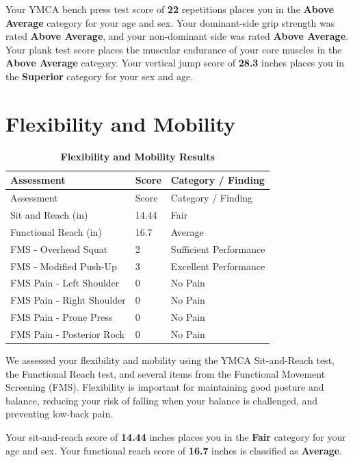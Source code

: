 \documentclass[
]{article}
\begin{document}
Your YMCA bench press test score of \textbf{22} repetitions places you
in the \textbf{Above Average} category for your age and sex. Your
dominant-side grip strength was rated \textbf{Above Average}, and your
non-dominant side was rated \textbf{Above Average}. Your plank test
score places the muscular endurance of your core muscles in the
\textbf{Above Average} category. Your vertical jump score of
\textbf{28.3} inches places you in the \textbf{Superior} category for
your sex and age.

\newpage

\section{Flexibility and Mobility}\label{flexibility-and-mobility}

\begin{longtable}[]{@{}lll@{}}
\caption{\textbf{Flexibility and Mobility Results}}\tabularnewline
\toprule\noalign{}
Assessment & Score & Category / Finding \\
\midrule\noalign{}
\endfirsthead
\toprule\noalign{}
Assessment & Score & Category / Finding \\
\midrule\noalign{}
\endhead
\bottomrule\noalign{}
\endlastfoot
Sit and Reach (in) & 14.44 & Fair \\
Functional Reach (in) & 16.7 & Average \\
FMS - Overhead Squat & 2 & Sufficient Performance \\
FMS - Modified Push-Up & 3 & Excellent Performance \\
FMS Pain - Left Shoulder & 0 & No Pain \\
FMS Pain - Right Shoulder & 0 & No Pain \\
FMS Pain - Prone Press & 0 & No Pain \\
FMS Pain - Posterior Rock & 0 & No Pain \\
\end{longtable}

We assessed your flexibility and mobility using the YMCA Sit-and-Reach
test, the Functional Reach test, and several items from the Functional
Movement Screening (FMS). Flexibility is important for maintaining good
posture and balance, reducing your risk of falling when your balance is
challenged, and preventing low-back pain.

Your sit-and-reach score of \textbf{14.44} inches places you in the
\textbf{Fair} category for your age and sex. Your functional reach score
of \textbf{16.7} inches is classified as \textbf{Average}.
\end{document}
